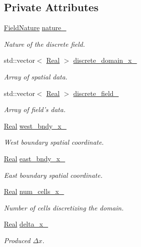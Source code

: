 \subsection*{Private Attributes}
\begin{DoxyCompactItemize}
\item 
\hyperlink{group__c02-enums_ga4c54f2a329cfb4e56213b02a259d19e2}{Field\+Nature} \hyperlink{classmtk_1_1UniStgGrid1D_a061b66c92532b1498ce0e15418754911}{nature\+\_\+}
\begin{DoxyCompactList}\small\item\em Nature of the discrete field. \end{DoxyCompactList}\item 
std\+::vector$<$ \hyperlink{group__c01-roots_gac080bbbf5cbb5502c9f00405f894857d}{Real} $>$ \hyperlink{classmtk_1_1UniStgGrid1D_a0a1f9c00e21659e05f414dd97e2a52e3}{discrete\+\_\+domain\+\_\+x\+\_\+}
\begin{DoxyCompactList}\small\item\em Array of spatial data. \end{DoxyCompactList}\item 
std\+::vector$<$ \hyperlink{group__c01-roots_gac080bbbf5cbb5502c9f00405f894857d}{Real} $>$ \hyperlink{classmtk_1_1UniStgGrid1D_a7379a5c6d16210cdd61ffa731bc47edc}{discrete\+\_\+field\+\_\+}
\begin{DoxyCompactList}\small\item\em Array of field's data. \end{DoxyCompactList}\item 
\hyperlink{group__c01-roots_gac080bbbf5cbb5502c9f00405f894857d}{Real} \hyperlink{classmtk_1_1UniStgGrid1D_a6910438d3396d0b9a130d11d16979c46}{west\+\_\+bndy\+\_\+x\+\_\+}
\begin{DoxyCompactList}\small\item\em West boundary spatial coordinate. \end{DoxyCompactList}\item 
\hyperlink{group__c01-roots_gac080bbbf5cbb5502c9f00405f894857d}{Real} \hyperlink{classmtk_1_1UniStgGrid1D_a69a7d6be3171e53177e476348d04f4ae}{east\+\_\+bndy\+\_\+x\+\_\+}
\begin{DoxyCompactList}\small\item\em East boundary spatial coordinate. \end{DoxyCompactList}\item 
\hyperlink{group__c01-roots_gac080bbbf5cbb5502c9f00405f894857d}{Real} \hyperlink{classmtk_1_1UniStgGrid1D_afa43750db0029b7454aef343759e7097}{num\+\_\+cells\+\_\+x\+\_\+}
\begin{DoxyCompactList}\small\item\em Number of cells discretizing the domain. \end{DoxyCompactList}\item 
\hyperlink{group__c01-roots_gac080bbbf5cbb5502c9f00405f894857d}{Real} \hyperlink{classmtk_1_1UniStgGrid1D_a12577bbe0b88e9a0ac9b2267f2fcc48c}{delta\+\_\+x\+\_\+}
\begin{DoxyCompactList}\small\item\em Produced $ \Delta x $. \end{DoxyCompactList}\end{DoxyCompactItemize}
